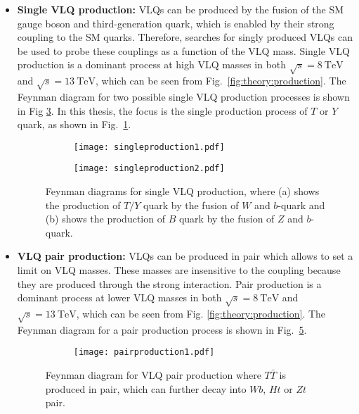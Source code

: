 \begin{itemize}
\item \textbf{Single VLQ production:} VLQs can be produced by the fusion of the SM gauge boson and third-generation quark, which is enabled by their strong coupling to the SM quarks. Therefore, searches for singly produced VLQs can be used to probe these couplings as a function of the VLQ mass. Single VLQ production is a dominant process at high VLQ masses in both $\sqrt{s}=\SI[per-mode=symbol]{8}{\tera\electronvolt}$ and $\sqrt{s}=\SI[per-mode=symbol]{13}{\tera\electronvolt}$, which can be seen from Fig.\ \ref{fig:theory:production}. The Feynman diagram for two possible single VLQ production processes is shown in Fig \ref{fig:theory:production:single}. In this thesis, the focus is the single production process of $T$ or $Y$ quark, as shown in Fig.\ \ref{fig:theory:production:single:ty}.

\begin{figure}[hbt!]
	\centering
	\begin{subfigure}{.4\textwidth}
		\centering
		\texttt{[image: singleproduction1.pdf]}
		\caption{}
		\label{fig:theory:production:single:ty}
	\end{subfigure}\hspace{1cm}
	\begin{subfigure}{.35\textwidth}
		\centering
		\texttt{[image: singleproduction2.pdf]}
		\caption{}
		\label{fig:theory:production:single:b}
	\end{subfigure}
	\caption{Feynman diagrams for single VLQ production, where (a) shows the production of $T/Y$ quark by the fusion of $W$ and $b$-quark and (b) shows the production of $B$ quark by the fusion of $Z$ and $b$-quark.~\cite{vlqpaper}}
	\label{fig:theory:production:single}
\end{figure}

\item \textbf{VLQ pair production:} VLQs can be produced in pair which allows to set a limit on VLQ masses. These masses are insensitive to the coupling because they are produced through the strong interaction. Pair production is a dominant process at lower VLQ masses in both  $\sqrt{s}=\SI[per-mode=symbol]{8}{\tera\electronvolt}$ and $\sqrt{s}=\SI[per-mode=symbol]{13}{\tera\electronvolt}$, which can be seen from Fig. \ref{fig:theory:production}. The Feynman diagram for a pair production process is shown in Fig.\ \ref{fig:theory:production:pair}.

\begin{figure}[hbt!]
	\centering
	\begin{subfigure}{.4\textwidth}
		\centering
		\texttt{[image: pairproduction1.pdf]}
		\caption{}
		\label{fig:theory:production:pair:t}
	\end{subfigure}
	\caption{Feynman diagram for VLQ pair production where $T\bar{T}$ is produced in pair, which can further decay into $Wb$, $Ht$ or $Zt$ pair.~\cite{pairproductiont}}
	\label{fig:theory:production:pair}
\end{figure}

\end{itemize}


